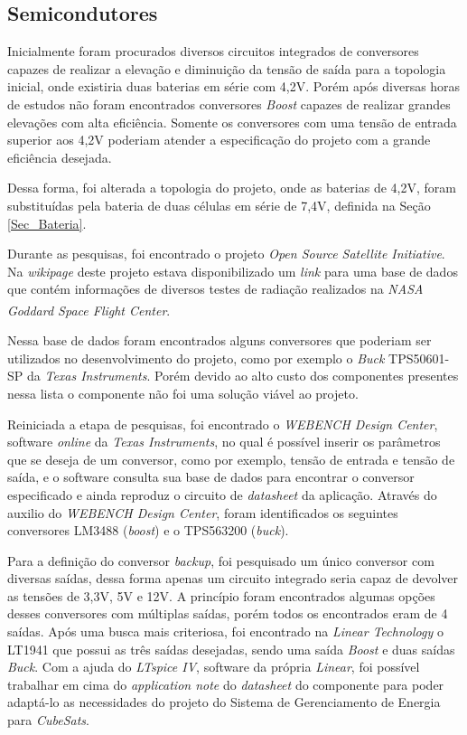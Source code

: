 \documentclass[
	12pt,				%
	openright,			%
	oneside,			%
	a4paper,			%
	english,			%
	french,				%
	spanish,			%
	brazil,				%
	oldfontcommands
	]{abntex2}
\begin{document}
\subsection[Semicondutores]{Semicondutores}\label{Sec_Semicondutores}

	Inicialmente foram procurados diversos circuitos integrados de conversores capazes de realizar a elevação e diminuição da tensão de saída para a topologia inicial, onde existiria duas baterias em série com 4,2V. Porém após diversas horas de estudos não foram encontrados conversores \textit{Boost} capazes de realizar grandes elevações com alta eficiência. Somente os conversores com uma tensão de entrada superior aos 4,2V poderiam atender a especificação do projeto com a grande eficiência desejada.
	
	Dessa forma, foi alterada a topologia do projeto, onde as baterias de 4,2V, foram substituídas pela bateria de duas células em série de 7,4V, definida na Seção \ref{Sec_Bateria}.
	
	Durante as pesquisas, foi encontrado o projeto \textit{Open Source Satellite Initiative}. Na \textit{wikipage} deste projeto estava disponibilizado um \textit{link} para uma base de dados que contém informações de diversos testes de radiação realizados na \textit{NASA Goddard Space Flight Center}.\textsuperscript{\cite{OSSI}}\textsuperscript{\cite{OSSI2}}\textsuperscript{\cite{OSSI3}}
	
	Nessa base de dados foram encontrados alguns conversores que poderiam ser utilizados no desenvolvimento do projeto, como por exemplo o \textit{Buck} TPS50601-SP da \textit{Texas Instruments}. Porém devido ao alto custo dos componentes presentes nessa lista o componente não foi uma solução viável ao projeto.
	
	Reiniciada a etapa de pesquisas, foi encontrado o \textit{WEBENCH Design Center}, software \textit{online} da \textit{Texas Instruments}, no qual é possível inserir os parâmetros que se deseja de um conversor, como por exemplo, tensão de entrada e tensão de saída, e o software consulta sua base de dados para encontrar o conversor especificado e ainda reproduz o circuito de \textit{datasheet} da aplicação. Através do auxilio do \textit{WEBENCH Design Center}, foram identificados os seguintes conversores LM3488 (\textit{boost}) e o TPS563200 (\textit{buck}).
	
	Para a definição do conversor \textit{backup}, foi pesquisado um único conversor com diversas saídas, dessa forma apenas um circuito integrado seria capaz de devolver as tensões de 3,3V, 5V e 12V. A princípio foram encontrados algumas opções desses conversores com múltiplas saídas, porém todos os encontrados eram de 4 saídas. Após uma busca mais criteriosa, foi encontrado na \textit{Linear Technology} o LT1941 que possui as três saídas desejadas, sendo uma saída \textit{Boost} e duas saídas \textit{Buck}. Com a ajuda do \textit{LTspice IV}, software da própria \textit{Linear}, foi possível trabalhar em cima do \textit{application note} do \textit{datasheet} do componente para poder adaptá-lo as necessidades do projeto do Sistema de Gerenciamento de Energia para \textit{CubeSats}.
\end{document}
